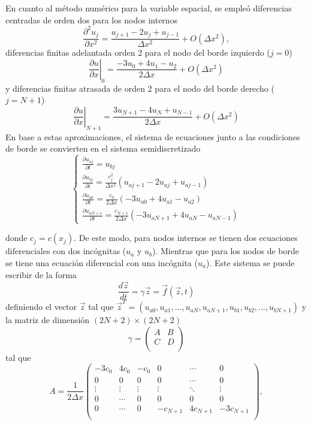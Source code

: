 \documentclass[aps,prb,twocolumn,superscriptaddress,floatfix,longbibliography,10pt]{revtex4-2}
\newcounter{para}
\begin{document}
En cuanto al método numérico para la variable espacial, se empleó diferencias centradas de orden dos para los nodos internos \cite{Moin}
\[\frac{\partial^2 u_j}{\partial x^2} = \frac{u_{j+1} - 2 u_j + u_{j-1}}{\Delta x^2} + O(\Delta x^2),  \]
diferencias finitas adelantada orden 2 para el nodo del borde izquierdo ($j = 0$) \cite{Moin}
\[\left . \frac{\partial u}{\partial x} \right |_0 = \frac{-3 u_0 + 4 u_{1} - u_{2}}{2 \Delta x} + O(\Delta x^2) \]
y diferencias finitas atrasada de orden 2 para el nodo del borde derecho ($j = N + 1$) \cite{diferencias_finitas_adelantadas}
\[\left . \frac{\partial u}{\partial x} \right |_{N+1} = \frac{3 u_{N+1} - 4 u_N + u_{N-1}}{2 \Delta x} + O(\Delta x^2) \]
En base a estas aproximaciones, el sistema de ecuaciones junto a las condiciones de borde se convierten en el sistema semidiscretizado
\begin{equation}
  \left \{ \begin{matrix}
   \frac{\partial u_{a j}}{\partial t} = u_{b j} \\
   \frac{\partial u_{b j}}{\partial t} = \frac{c_j^2}{\Delta x^2} (u_{a j+1} - 2 u_{a j} + u_{a j-1}) \\
   \frac{\partial u_{a 0}}{\partial t} = \frac{c_0}{2 \Delta x} (-3 u_{a 0} + 4 u_{a 1} - u_{a 2}) \\
   \frac{\partial u_{a N+1}}{\partial t} = \frac{c_{N+1}}{2 \Delta x} (-3u_{a N+1} + 4 u_{a N} - u_{a N-1}) 
  \end{matrix} \right .
  \label{eq:sistema_semi_discretizado}
\end{equation}


donde $c_j = c(x_j)$. De este modo, para nodos internos se tienen dos ecuaciones diferenciales con dos incógnitas ($u_a$ y $u_b$). Mientras que para los nodos de borde se tiene una ecuación diferencial con una incógnita ($u_a$). Este sistema se puede escribir de la forma
\[\frac{d \vec{z}}{dt} = \gamma \vec{z} = \vec{f}(\vec{z},t)\]
definiendo el vector $\vec{z}$ tal que $\vec{z}^T = (u_{a 0}, u_{a 1}, \dots, u_{a N}, u_{a N+1}, u_{b 1}, u_{b 2}, \dots, u_{b N+1})$ y la matriz de dimensión $(2N+2) \times (2N+2)$
\[\gamma = \begin{pmatrix}
  A & B \\
  C & D \\
  \end{pmatrix}\]
tal que
\[A = \frac{1}{2 \Delta x} \begin{pmatrix}
  -3c_0 & 4c_0 & -c_0 & 0 & \cdots & 0 \\
  0 & 0 & 0 & 0 & \cdots & 0 \\
  \vdots & \vdots & \vdots & \vdots & \ddots & \vdots \\
  0 & \cdots & 0 & 0 & 0 & 0 \\
  0 & \cdots & 0 & -c_{N+1} & 4c_{N+1} & -3c_{N+1} \\
  \end{pmatrix}, \]
\end{document}
